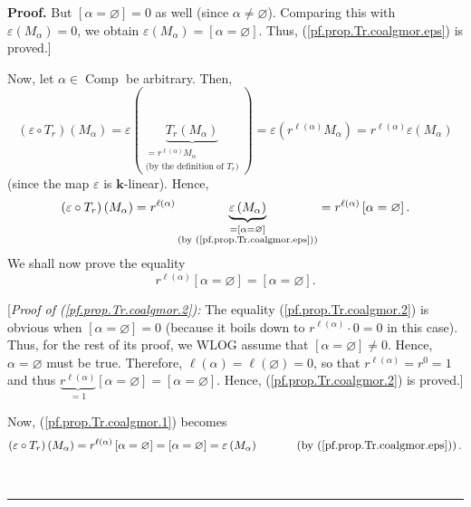 \documentclass[numbers=enddot,12pt,final,onecolumn,notitlepage]{scrartcl}%
\theoremstyle{definition}
\newenvironment{proof}[1][Proof]{\noindent\textbf{#1.} }{\ \rule{0.5em}{0.5em}}
\newenvironment{verlong}{}{}
\begin{document}
\begin{verlong}
\begin{proof}
But $\left[  \alpha=\varnothing\right]  =0$ as well (since $\alpha
\neq\varnothing$). Comparing this with $\varepsilon\left(  M_{\alpha}\right)
=0$, we obtain $\varepsilon\left(  M_{\alpha}\right)  =\left[  \alpha
=\varnothing\right]  $. Thus, (\ref{pf.prop.Tr.coalgmor.eps}) is proved.]
\medskip

Now, let $\alpha\in\operatorname*{Comp}$ be arbitrary. Then,
\[
\left(  \varepsilon\circ T_{r}\right)  \left(  M_{\alpha}\right)
=\varepsilon\left(  \underbrace{T_{r}\left(  M_{\alpha}\right)  }%
_{\substack{=r^{\ell\left(  \alpha\right)  }M_{\alpha}\\\text{(by the
definition of }T_{r}\text{)}}}\right)  =\varepsilon\left(  r^{\ell\left(
\alpha\right)  }M_{\alpha}\right)  =r^{\ell\left(  \alpha\right)  }%
\varepsilon\left(  M_{\alpha}\right)
\]
(since the map $\varepsilon$ is $\mathbf{k}$-linear). Hence,%
\begin{equation}
\left(  \varepsilon\circ T_{r}\right)  \left(  M_{\alpha}\right)
=r^{\ell\left(  \alpha\right)  }\underbrace{\varepsilon\left(  M_{\alpha
}\right)  }_{\substack{=\left[  \alpha=\varnothing\right]  \\\text{(by
(\ref{pf.prop.Tr.coalgmor.eps}))}}}=r^{\ell\left(  \alpha\right)  }\left[
\alpha=\varnothing\right]  . \label{pf.prop.Tr.coalgmor.1}%
\end{equation}
We shall now prove the equality
\begin{equation}
r^{\ell\left(  \alpha\right)  }\left[  \alpha=\varnothing\right]  =\left[
\alpha=\varnothing\right]  . \label{pf.prop.Tr.coalgmor.2}%
\end{equation}


[\textit{Proof of (\ref{pf.prop.Tr.coalgmor.2}):} The equality
(\ref{pf.prop.Tr.coalgmor.2}) is obvious when $\left[  \alpha=\varnothing
\right]  =0$ (because it boils down to $r^{\ell\left(  \alpha\right)  }%
\cdot0=0$ in this case). Thus, for the rest of its proof, we WLOG assume that
$\left[  \alpha=\varnothing\right]  \neq0$. Hence, $\alpha=\varnothing$ must
be true. Therefore, $\ell\left(  \alpha\right)  =\ell\left(  \varnothing
\right)  =0$, so that $r^{\ell\left(  \alpha\right)  }=r^{0}=1$ and thus
$\underbrace{r^{\ell\left(  \alpha\right)  }}_{=1}\left[  \alpha
=\varnothing\right]  =\left[  \alpha=\varnothing\right]  $. Hence,
(\ref{pf.prop.Tr.coalgmor.2}) is proved.]

Now, (\ref{pf.prop.Tr.coalgmor.1}) becomes
\[
\left(  \varepsilon\circ T_{r}\right)  \left(  M_{\alpha}\right)
=r^{\ell\left(  \alpha\right)  }\left[  \alpha=\varnothing\right]  =\left[
\alpha=\varnothing\right]  =\varepsilon\left(  M_{\alpha}\right)
\ \ \ \ \ \ \ \ \ \ \left(  \text{by (\ref{pf.prop.Tr.coalgmor.eps})}\right)
.
\]



\end{proof}
\end{verlong}
\end{document}
